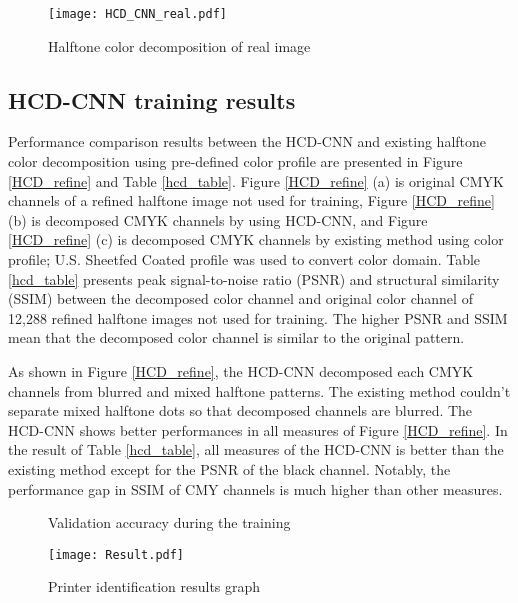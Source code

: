 \documentclass[5p, times]{elsarticle}
\begin{document}
\begin{figure}[t]
    \centerline{\texttt{[image: HCD\_CNN\_real.pdf]}}
    \caption{Halftone color decomposition of real image
    } \label{HCD_real}
\end{figure}

\subsection{HCD-CNN training results}
Performance comparison results between the HCD-CNN and existing halftone color decomposition using pre-defined color profile are presented in Figure \ref{HCD_refine} and Table \ref{hcd_table}. Figure \ref{HCD_refine} (a) is original CMYK channels of a refined halftone image not used for training, Figure \ref{HCD_refine} (b) is decomposed CMYK channels by using HCD-CNN, and Figure \ref{HCD_refine} (c) is decomposed CMYK channels by existing method using color profile; U.S. Sheetfed Coated profile was used to convert color domain. Table \ref{hcd_table} presents peak signal-to-noise ratio (PSNR) and structural similarity (SSIM) between the decomposed color channel and original color channel of 12,288 refined halftone images not used for training. The higher PSNR and SSIM mean that the decomposed color channel is similar to the original pattern.

As shown in Figure \ref{HCD_refine}, the HCD-CNN decomposed each CMYK channels from blurred and mixed halftone patterns. The existing method couldn't separate mixed halftone dots so that decomposed channels are blurred. The HCD-CNN shows better performances in all measures of Figure \ref{HCD_refine}. In the result of Table \ref{hcd_table}, all measures of the HCD-CNN is better than the existing method except for the PSNR of the black channel. Notably, the performance gap in SSIM of CMY channels is much higher than other measures.

\begin{figure}[t!]
    \centerline
    {
    	    	\hspace{2pt}
    }
    \caption{Validation accuracy during the training}
    \label{Phase1_2}	
\end{figure}

\begin{figure}[t]
    \centerline{\texttt{[image: Result.pdf]}}
    \caption{Printer identification results graph
    } \label{Result}
\end{figure}
\end{document}
